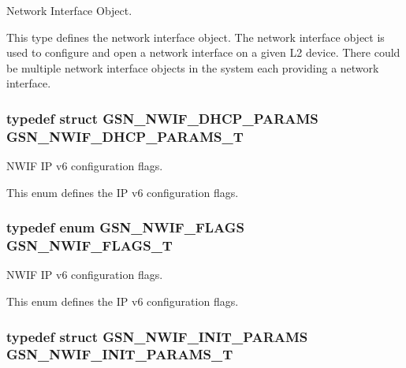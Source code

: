 Network Interface Object. 

This type defines the network interface object. The network interface object is used to configure and open a network interface on a given L2 device. There could be multiple network interface objects in the system each providing a network interface. \hypertarget{a00670_ga9f9d4b76c96f7c8444291e1706c4fcff}{
\subsubsection[{GSN\_\-NWIF\_\-DHCP\_\-PARAMS\_\-T}]{\setlength{\rightskip}{0pt plus 5cm}typedef struct {\bf GSN\_\-NWIF\_\-DHCP\_\-PARAMS} {\bf GSN\_\-NWIF\_\-DHCP\_\-PARAMS\_\-T}}}
\label{a00670_ga9f9d4b76c96f7c8444291e1706c4fcff}


NWIF IP v6 configuration flags. 

This enum defines the IP v6 configuration flags. \hypertarget{a00670_ga2c209f2b9b6b2b6b0b2e1132acd45891}{
\subsubsection[{GSN\_\-NWIF\_\-FLAGS\_\-T}]{\setlength{\rightskip}{0pt plus 5cm}typedef enum {\bf GSN\_\-NWIF\_\-FLAGS} {\bf GSN\_\-NWIF\_\-FLAGS\_\-T}}}
\label{a00670_ga2c209f2b9b6b2b6b0b2e1132acd45891}


NWIF IP v6 configuration flags. 

This enum defines the IP v6 configuration flags. \hypertarget{a00670_gaa7bcca8daa18d56c6d5f107fc3523370}{
\subsubsection[{GSN\_\-NWIF\_\-INIT\_\-PARAMS\_\-T}]{\setlength{\rightskip}{0pt plus 5cm}typedef struct {\bf GSN\_\-NWIF\_\-INIT\_\-PARAMS}  {\bf GSN\_\-NWIF\_\-INIT\_\-PARAMS\_\-T}}}
\label{a00670_gaa7bcca8daa18d56c6d5f107fc3523370}



